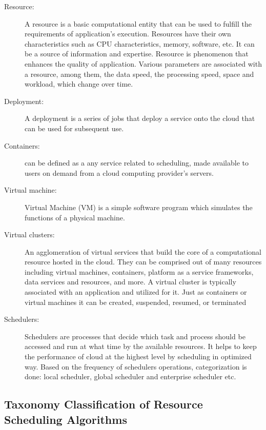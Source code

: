 \documentclass[final,5p,times,twocolumn]{elsarticle}
\begin{document}
\begin{description}

\item[Resource:] A resource is a basic computational entity that can
  be used to fulfill the requirements of application's execution.
  Resources have their own characteristics such as CPU
  characteristics, memory, software, etc. It can be a source of
  information and expertise. Resource is phenomenon that enhances the
  quality of application. Various parameters are associated with a
  resource, among them, the data speed, the processing speed, space
  and workload, which change over time.

\item[Deployment:] A deployment is a series of jobs that deploy a
  service onto the cloud that can be used for subsequent use.

\item[Containers:] can be defined as a any service related to
  scheduling, made available to users on demand from a cloud computing
  provider's servers.

\item[Virtual machine:] Virtual Machine (VM) is a simple software
  program which simulates the functions of a physical machine.

\item[Virtual clusters:] An agglomeration of virtual services that
  build the core of a computational resource hosted in the cloud. They
  can be comprised out of many resources including virtual machines,
  containers, platform as a service frameworks, data services and
  resources, and more. A virtual cluster is typically associated with
  an application and utilized for it. Just as containers or virtual
  machines it can be created, suspended, resumed, or terminated

\item[Schedulers:] Schedulers are processes that decide which task and
  process should be accessed and run at what time by the available
  resources. It helps to keep the performance of cloud at the highest
  level by scheduling in optimized way. Based on the frequency of
  schedulers operations, categorization is done: local scheduler,
  global scheduler and enterprise scheduler etc.

\end{description}

\subsection{Taxonomy Classification of Resource Scheduling Algorithms}\label{S:algo}
\end{document}
